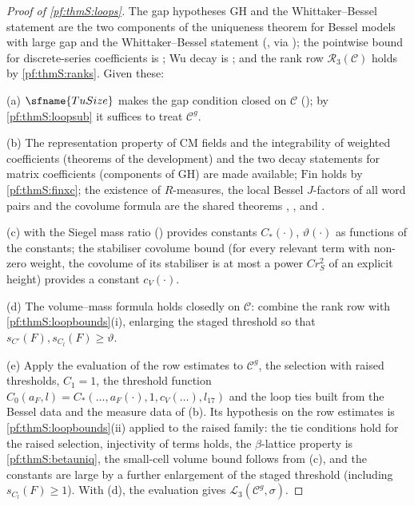 \begin{proof}[Proof of \cref{pf:thmS:loops}]
The gap hypotheses $\mathrm{GH}$ and the Whittaker--Bessel statement are the two components of the uniqueness theorem for Bessel
models with large gap and the Whittaker--Bessel statement
(, via
); the pointwise bound for discrete-series coefficients is
; Wu decay is
; and the rank row $\mathcal{R}_{3}(\mathcal C)$ holds by \cref{pf:thmS:ranks}.
Given these:

(a) $\sfname{TuSize}$ makes the gap condition closed on $\mathcal C$ ();
by \cref{pf:thmS:loopsub} it suffices to treat $\mathcal C^g$.

(b) The representation property of CM fields and the integrability of weighted coefficients (theorems of the development) and the two decay statements for matrix coefficients (components of $\mathrm{GH}$) are made available;
$\mathrm{Fin}$ holds by \cref{pf:thmS:finxc}; the existence of $R$-measures, the local Bessel $J$-factors of all word
pairs and the covolume formula are the shared theorems
, , and .

(c)  with the Siegel mass ratio () provides
constants $C_*(\cdot)$, $\vartheta(\cdot)$ as functions of the constants; the stabiliser covolume bound
 (for every relevant term with non-zero weight,
the covolume of its stabiliser is at most a power $C r_S^2$ of an explicit height) provides a constant $c_V(\cdot)$.

(d) The volume--mass formula holds closedly on $\mathcal C$: combine the rank row with \cref{pf:thmS:loopbounds}(i), enlarging the
staged threshold so that $s_{C'}(F),s_{C_l}(F)\ge\vartheta$.

(e) Apply the evaluation of the row estimates to $\mathcal C^g$, the selection with raised thresholds, $C_1=1$, the threshold function
$C_0(a_F,l)=C_*(\dots,a_F(\cdot),1,c_V(\dots),l_{17})$ and the loop ties built from the Bessel data and the measure data of
(b). Its hypothesis on the row estimates is \cref{pf:thmS:loopbounds}(ii) applied to the raised family: the tie conditions hold for
the raised selection, injectivity of terms holds, the $\beta$-lattice property is \cref{pf:thmS:betauniq}, the small-cell volume
bound follows from (c), and the constants are large by a further enlargement of the staged threshold (including
$s_{C_l}(F)\ge1$). With (d), the evaluation gives $\mathcal{L}_{3}(\mathcal C^g,\sigma)$.
\end{proof}

